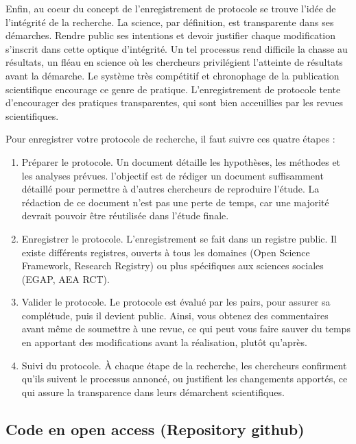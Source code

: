\documentclass[
  letterpaper,
  DIV=11,
  numbers=noendperiod]{scrreprt}
\providecommand{\tightlist}{%
  \setlength{\itemsep}{0pt}\setlength{\parskip}{0pt}}\usepackage{longtable,booktabs,array}
\begin{document}
Enfin, au coeur du concept de l'enregistrement de protocole se trouve
l'idée de l'intégrité de la recherche. La science, par définition, est
transparente dans ses démarches. Rendre public ses intentions et devoir
justifier chaque modification s'inscrit dans cette optique d'intégrité.
Un tel processus rend difficile la chasse au résultats, un fléau en
science où les chercheurs privilégient l'atteinte de résultats avant la
démarche. Le système très compétitif et chronophage de la publication
scientifique encourage ce genre de pratique. L'enregistrement de
protocole tente d'encourager des pratiques transparentes, qui sont bien
acceuillies par les revues scientifiques.

Pour enregistrer votre protocole de recherche, il faut suivre ces quatre
étapes :

\begin{enumerate}
\def\labelenumi{\arabic{enumi}.}
\tightlist
\item
  Préparer le protocole. Un document détaille les hypothèses, les
  méthodes et les analyses prévues. l'objectif est de rédiger un
  document suffisamment détaillé pour permettre à d'autres chercheurs de
  reproduire l'étude. La rédaction de ce document n'est pas une perte de
  temps, car une majorité devrait pouvoir être réutilisée dans l'étude
  finale.
\item
  Enregistrer le protocole. L'enregistrement se fait dans un registre
  public. Il existe différents registres, ouverts à tous les domaines
  (Open Science Framework, Research Registry) ou plus spécifiques aux
  sciences sociales (EGAP, AEA RCT).
\item
  Valider le protocole. Le protocole est évalué par les pairs, pour
  assurer sa complétude, puis il devient public. Ainsi, vous obtenez des
  commentaires avant même de soumettre à une revue, ce qui peut vous
  faire sauver du temps en apportant des modifications avant la
  réalisation, plutôt qu'après.
\item
  Suivi du protocole. À chaque étape de la recherche, les chercheurs
  confirment qu'ils suivent le processus annoncé, ou justifient les
  changements apportés, ce qui assure la transparence dans leurs
  démarchent scientifiques.
\end{enumerate}

\subsection{Code en open access (Repository
github)}\label{code-en-open-access-repository-github}
\end{document}
